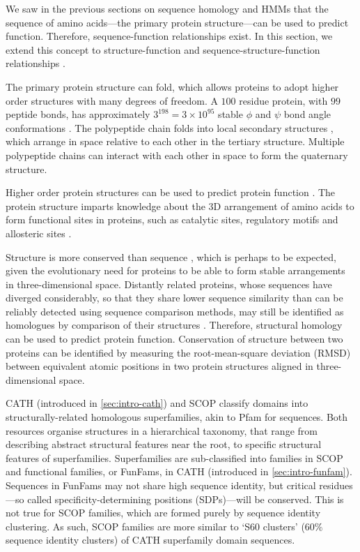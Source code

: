 We saw in the previous sections on sequence homology and HMMs that the sequence of amino acids---the primary protein structure---can be used to predict function. Therefore, sequence-function relationships exist. In this section, we extend this concept to structure-function and sequence-structure-function relationships \cite{Loewenstein2009,Lee2007,Watson2005}.

The primary protein structure can fold, which allows proteins to adopt higher order structures with many degrees of freedom. A $100$ residue protein, with $99$ peptide bonds, has approximately $3^{198} = 3\times 10^{95}$ stable $\phi$ and $\psi$ bond angle conformations \cite{Levinthal1969}. The polypeptide chain folds into local secondary structures \cite{Mizuguchi1995}, which arrange in space relative to each other in the tertiary structure. Multiple polypeptide chains can interact with each other in space to form the quaternary structure.

Higher order protein structures can be used to predict protein function \cite{Watson2005,Loewenstein2009}. The protein structure imparts knowledge about the 3D arrangement of amino acids to form functional sites in proteins, such as catalytic sites, regulatory motifs and allosteric sites \cite{Friedberg2006}.

Structure is more conserved than sequence \cite{Chothia1986}, which is perhaps to be expected, given the evolutionary need for proteins to be able to form stable arrangements in three-dimensional space.
Distantly related proteins, whose sequences have diverged considerably, so that they share lower sequence similarity than can be reliably detected using sequence comparison methods, may still be identified as homologues by comparison of their structures \cite{Lee2007}.
Therefore, structural homology can be used to predict protein function.
Conservation of structure between two proteins can be identified by measuring the root-mean-square deviation (RMSD) between equivalent atomic positions in two protein structures aligned in three-dimensional space.

CATH \cite{Sillitoe2019} (introduced in \ref{sec:intro-cath}) and SCOP \cite{Andreeva2020} classify domains into structurally-related homologous superfamilies, akin to Pfam for sequences. Both resources organise structures in a hierarchical taxonomy, that range from describing abstract structural features near the root, to specific structural features of superfamilies. Superfamilies are sub-classified into families in SCOP and functional families, or FunFams, in CATH (introduced in \ref{sec:intro-funfam}). Sequences in FunFams may not share high sequence identity, but critical residues---so called specificity-determining positions (SDPs)---will be conserved. This is not true for SCOP families, which are formed purely by sequence identity clustering. As such, SCOP families are more similar to `S60 clusters' (60$\%$ sequence identity clusters) of CATH superfamily domain sequences.

